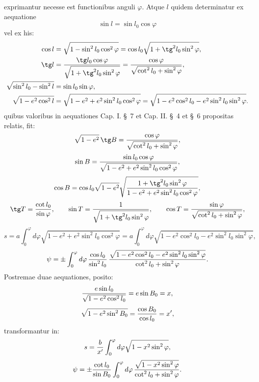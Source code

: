 exprimantur necesse est functionibus anguli $\varphi$. Atque $l$ quidem determinatur ex aequatione
\[
 \sin l=\sin l_0\cos\varphi
\]
vel ex his:
\[
\begin{aligned}
\cos l&=\sqrt{1-\sin^2l_0\cos^2\varphi}=\cos l_0\sqrt{1+\tg^2l_0\sin^2\varphi},\\
\tg l&={\tg l_0\cos\varphi\over\sqrt{1+\tg^2l_0\sin^2\varphi}}
={\cos\varphi\over\sqrt{\cot^2l_0+\sin^2\varphi}},\\
\sqrt{\sin^2l_0-\sin^2l}&=\sin l_0\sin\varphi,\\
\sqrt{1-e^2\cos^2l}&=\sqrt{1-e^2+e^2\sin^2l_0\cos^2\varphi}
=\sqrt{1-e^2\cos^2l_0-e^2\sin^2l_0\sin^2\varphi}.
\end{aligned}
\]
quibus valoribus in aequationes Cap. I. \S\ 7 et Cap. II. \S\ 4 et \S\ 6 propositas relatis, fit:
\[
 \sqrt{1-e^2}\,\tg B={\cos\varphi\over\sqrt{\cot^2l_0+\sin^2\varphi}},
\]
\[
 \sin B={\sin l_0\cos\varphi\over\sqrt{1-e^2+e^2\sin^2l_0\cos^2\varphi}},
\]
\[
 \cos B=\cos l_0\sqrt{1-e^2}\sqrt{\frac{1+\tg^2l_0\sin^2\varphi}{1-e^2+e^2\sin^2l_0\cos^2\varphi}},
\]
\[
 \tg T={\cot l_0\over\sin\varphi},\qquad
 \sin T={1\over\sqrt{1+\tg^2l_0\sin^2\varphi}},\qquad
 \cos T={\sin\varphi\over\sqrt{\cot^2l_0+\sin^2\varphi}},
\]
\[
 s=a\int_0^\varphi d\varphi\sqrt{1-e^2+e^2\sin^2l_0\cos^2\varphi}
 =a\int_0^\varphi d\varphi\sqrt{1-e^2\cos^2l_0-e^2\sin^2l_0\sin^2\varphi},
\]
\[
 \psi=\pm\int_0^\varphi d\varphi\,{\cos l_0\over\sin^2l_0}\,
 {\sqrt{1-e^2\cos^2l_0-e^2\sin^2l_0\sin^2\varphi}\over\cot^2l_0+\sin^2\varphi}.
\]
Postremae duae aequationes, posito:
\[
 {e\sin l_0\over\sqrt{1-e^2\cos^2l_0}}=e\sin B_0=x,
\]
\[
 \sqrt{1-e^2\sin^2B_0}={\cos B_0\over\cos l_0}=x',
\]
transformantur in:
\[
 s={b\over x'}\int_0^\varphi d\varphi\sqrt{1-x^2\sin^2\varphi},
\]
\[
 \psi=\pm{\cot l_0\over\sin B_0}\int_0^\varphi d\varphi\,{\sqrt{1-x^2\sin^2\varphi}\over\cot^2l_0+\sin^2\varphi}.
\]
